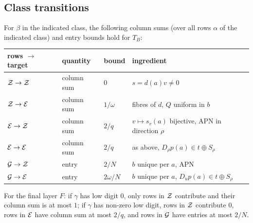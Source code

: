 \subsection{Class transitions}
\begin{proposition}\label{prop:table}
For $\beta$ in the indicated class, the following column sums (over all rows $\alpha$ of the indicated
class) and entry bounds hold for $T_B$:
\begin{center}
\begin{tabular}{llp{}p{}}
\toprule
rows $\to$ target & quantity & bound & ingredient\\
\midrule
$\mathcal{Z}\to\mathcal{Z}$ & column sum & $0$ & $s=d(a)v\ne0$\\
$\mathcal{Z}\to\mathcal{E}$ & column sum & $1/\omega$ & fibres of $d$, $Q$ uniform in $b$\\
$\mathcal{E}\to\mathcal{Z}$ & column sum & $2/q$ & $v\mapsto s_v(a)$ bijective, APN in direction $\rho$\\
$\mathcal{E}\to\mathcal{E}$ & column sum & $2/q$ & as above, $D_\rho p(a)\in t\oplus S_\rho$\\
$\mathcal{G}\to\mathcal{Z}$ & entry & $2/N$ & $b$ unique per $a$, APN\\
$\mathcal{G}\to\mathcal{E}$ & entry & $2\omega/N$ & $b$ unique per $a$, $D_up(a)\in t\oplus S_\rho$\\
\bottomrule
\end{tabular}
\end{center}
For the final layer $F$: if $\gamma$ has low digit $0$, only rows in $\mathcal{Z}$ contribute and their column
sum is at most $1$; if $\gamma$ has non-zero low digit, rows in $\mathcal{Z}$ contribute $0$, rows in $\mathcal{E}$ have
column sum at most $2/q$, and rows in $\mathcal{G}$ have entries at most $2/N$.
\end{proposition}
